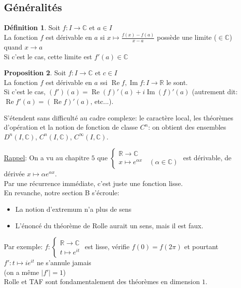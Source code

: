 \documentclass[10pt,a4paper]{article}
\theoremstyle{definition}
\newtheorem{proposition}{Proposition}[section]
\newtheorem{definition}[proposition]{Définition}
\DeclareMathOperator{\re}{Re}
\DeclareMathOperator{\im}{Im}
\begin{document}
\subsection{Généralités}
\begin{definition}
Soit $f: I \to \mathbb{C}$ et $a \in I$ \\
La fonction $f$ est dérivable en $a$ si $x \mapsto \frac{f(x) - f(a)}{x - a}$ possède une limite ($\in \mathbb{C}$) quand $x \to a$ \\
Si c'est le cas, cette limite est $f'(a) \in \mathbb{C}$
\end{definition}
\begin{proposition}
Soit $f: I \to \mathbb{C}$ et $c \in I$ \\
La fonction $f$ est dérivable en $a$ ssi $\re f, \im f : I \to \mathbb{R}$ le sont. \\
Si c'est le cas, $(f')(a) = \re(f)'(a) + i \im(f)'(a)$ (autrement dit: $\re f'(a) = (\re f)'(a)$, etc...).
\end{proposition}
S'étendent sans difficulté au cadre complexe: le caractère local, les théorèmes d'opération et la notion de fonction de classe $C^n$: on obtient des ensembles $D^n(I, \mathbb{C})$, $C^n(I, \mathbb{C})$, $C^\infty(I, \mathbb{C})$. \medskip

\noindent \uline{Rappel}: On a vu au chapitre $5$ que $\begin{cases}
\mathbb{R} \to \mathbb{C} \\
x \mapsto e^{\alpha x} \quad (\alpha \in \mathbb{C})
\end{cases}$
est dérivable, de dérivée $x \mapsto \alpha e^{\alpha x}$. \\
Par une récurrence immédiate, c'est juste une fonction lisse. \\
En revanche, notre section B s'écroule:
\begin{itemize}
\item La notion d'extremum n'a plus de sens
\item L'énoncé du théorème de Rolle aurait un sens, mais il est faux.
\end{itemize}
Par exemple: $f: \begin{cases}
\mathbb{R} \to \mathbb{C} \\
t \mapsto e^{it}
\end{cases}$
est lisse, vérifie $f(0) = f(2 \pi)$ et pourtant $f': t \mapsto ie^{it}$ ne s'annule jamais \\
(on a même $|f'| = 1$) \\
Rolle et TAF sont fondamentalement des théorèmes en dimension $1$.
\end{document}

